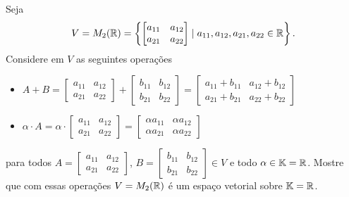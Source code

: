 \documentclass[12pt]{exam}
\begin{document}
    \questao{} Seja
    \[
        V = M_2(\mathbb{R}) = \left\{\begin{bmatrix}a_{11} & a_{12}\\a_{21} & a_{22} \end{bmatrix} \mid a_{11}, a_{12}, a_{21}, a_{22} \in \mathbb{R}\right\}.
    \]
    Considere em $V$ as seguintes operações
    \begin{itemize}
        \item $A + B = \begin{bmatrix}a_{11} & a_{12}\\a_{21} & a_{22} \end{bmatrix} + \begin{bmatrix}b_{11} & b_{12}\\b_{21} & b_{22} \end{bmatrix} = \begin{bmatrix}a_{11} + b_{11 }& a_{12} + b_{12}\\a_{21} + b_{21} & a_{22} + b_{22}\end{bmatrix}$
        \item $\alpha \cdot A = \alpha \cdot \begin{bmatrix}a_{11} & a_{12}\\a_{21} & a_{22} \end{bmatrix} = \begin{bmatrix}\alpha a_{11} & \alpha a_{12}\\\alpha a_{21} & \alpha a_{22} \end{bmatrix}$
    \end{itemize}
    para todos $A = \begin{bmatrix}a_{11} & a_{12}\\a_{21} & a_{22} \end{bmatrix}$, $B = \begin{bmatrix}b_{11} & b_{12}\\b_{21} & b_{22} \end{bmatrix} \in V$ e todo $\alpha \in \mathbb{K} = \mathbb{R}$.
    Mostre que com essas operações $V = M_2(\mathbb{R})$ é um espaço vetorial sobre $\mathbb{K} = \mathbb{R}$.

    \solucao
\end{document}
